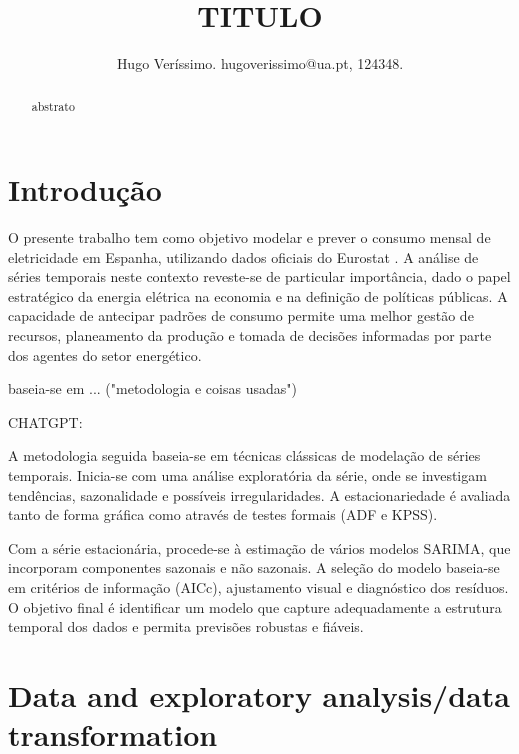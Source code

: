 \documentclass[journal]{IEEEtran}
\begin{document}
\title{TITULO}

\author{Hugo Veríssimo. hugoverissimo@ua.pt, 124348.}


\maketitle

\begin{abstract}
abstrato
\end{abstract}

\IEEEpeerreviewmaketitle

\section{Introdução}

O presente trabalho tem como objetivo modelar e prever o consumo mensal de eletricidade em Espanha, utilizando dados oficiais do Eurostat \cite{eurostat_nrg_cb_em}. A análise de séries temporais neste contexto reveste-se de particular importância, dado o papel estratégico da energia elétrica na economia e na definição de políticas públicas. A capacidade de antecipar padrões de consumo permite uma melhor gestão de recursos, planeamento da produção e tomada de decisões informadas por parte dos agentes do setor energético.

baseia-se em ... ("metodologia e coisas usadas")

CHATGPT:

A metodologia seguida baseia-se em técnicas clássicas de modelação de séries temporais. Inicia-se com uma análise exploratória da série, onde se investigam tendências, sazonalidade e possíveis irregularidades. A estacionariedade é avaliada tanto de forma gráfica como através de testes formais (ADF e KPSS).

Com a série estacionária, procede-se à estimação de vários modelos SARIMA, que incorporam componentes sazonais e não sazonais. A seleção do modelo baseia-se em critérios de informação (AICc), ajustamento visual e diagnóstico dos resíduos. O objetivo final é identificar um modelo que capture adequadamente a estrutura temporal dos dados e permita previsões robustas e fiáveis.



\section{Data and exploratory analysis/data transformation}
\end{document}
